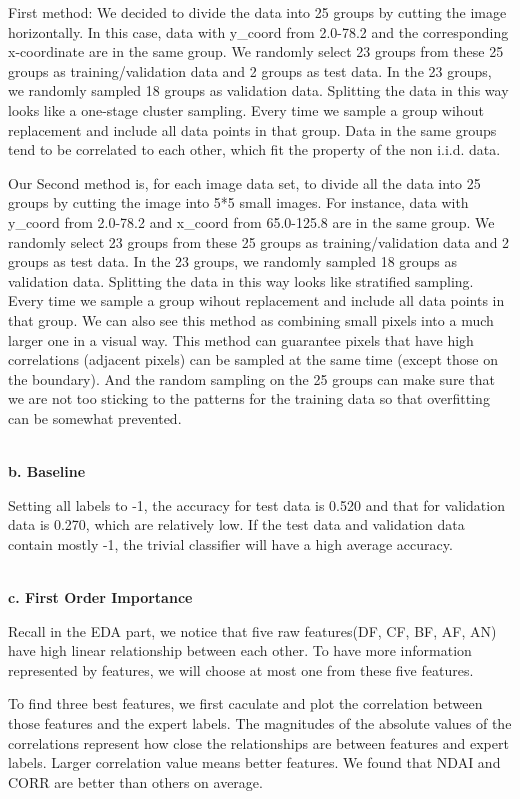 \documentclass[11pt]{article}
\begin{document}
First method:
We decided to divide the data into 25 groups by cutting the image horizontally. In this case, data with y\_coord from 2.0-78.2 and the corresponding x-coordinate are in the same group.  We randomly select 23 groups from these 25 groups as training/validation data and 2 groups as test data. In the 23 groups, we randomly sampled 18 groups as validation data. Splitting the data in this way looks like a one-stage cluster sampling. Every time we sample a group wihout replacement and include all data points in that group. Data in the same groups tend to be correlated to each other, which fit the property of the non i.i.d. data.

Our Second method is, for each image data set, to divide all the data into 25 groups by cutting the image into 5*5 small images. For instance, data with y\_coord from 2.0-78.2 and x\_coord from 65.0-125.8 are in the same group. We randomly select 23 groups from these 25 groups as training/validation data and 2 groups as test data. In the 23 groups, we randomly sampled 18 groups as validation data. Splitting the data in this way looks like stratified sampling. Every time we sample a group wihout replacement and include all data points in that group. We can also see this method as combining small pixels into a much larger one in a visual way. This method can guarantee pixels that have high correlations (adjacent pixels) can be sampled at the same time (except those on the boundary). And the random sampling on the 25 groups can make sure that we are not too sticking to the patterns for the training data so that overfitting can be somewhat prevented. 

\vspace{0.3cm}
\mbox{}\\
\textbf{b. Baseline}

Setting all labels to -1, the accuracy for test data is 0.520 and that for validation data is 0.270, which are relatively low. If the test data and validation data contain mostly -1, the trivial classifier will have a high average accuracy.

\vspace{0.3cm}
\mbox{}\\
\textbf{c. First Order Importance}

Recall in the EDA part, we notice that five raw features(DF, CF, BF, AF, AN) have high linear relationship between each other. To have more information represented by features, we will choose at most one from these five features.

To find three best features, we first caculate and plot the correlation between those features and the expert labels. The magnitudes of the absolute values of the correlations represent how close the relationships are between features and expert labels. Larger correlation value means better features. We found that NDAI and CORR are better than others on average. 
\end{document}
